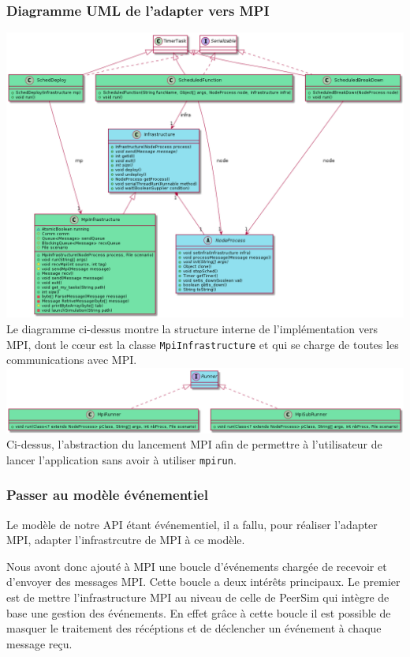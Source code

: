 \documentclass{article}
\begin{document}
				\subsubsection{Diagramme UML de l'adapter vers MPI}
				\vspace{1mm}
				\hspace*{-2.1cm} \includegraphics[width=19.5cm]{uml/mpi1.png}
				Le diagramme ci-dessus montre la structure interne de l'implémentation vers MPI, dont le cœur est la classe \verb|MpiInfrastructure|
				et qui se charge de toutes les communications avec MPI.
				\newpage
				\hspace*{-2.3cm} \includegraphics[width=20cm]{uml/mpi2.png}
				Ci-dessus, l'abstraction du lancement MPI afin de permettre à l'utilisateur de lancer l'application sans avoir à utiliser \verb|mpirun|.

				\subsubsection{Passer au modèle événementiel}
				Le modèle de notre API étant événementiel, il a fallu, pour réaliser l'adapter MPI,
				adapter l'infrastrcutre de MPI à ce modèle.

				Nous avont donc ajouté à MPI une boucle d'événements chargée de recevoir et
				d'envoyer des messages MPI. Cette boucle a deux intérêts principaux.
				Le premier est de mettre l'infrastructure MPI au niveau de celle de PeerSim qui
				intègre de base une gestion des événements. En effet grâce à cette boucle il est
				possible de masquer le traitement des récéptions et de déclencher un événement à
				chaque message reçu.
\end{document}
